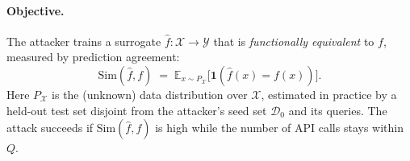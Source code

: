 \documentclass[sigconf,anonymous,review]{acmart}
\begin{document}
\paragraph{Objective.}
The attacker trains a surrogate $\hat{f} : \mathcal{X} \to \mathcal{Y}$ that is
\emph{functionally equivalent} to $f$, measured by prediction agreement:
\begin{equation}
    \mathrm{Sim}(\hat{f}, f) \;=\; \mathbb{E}_{x \sim P_{\mathcal{X}}}
    \bigl[\mathbf{1}(\hat{f}(x) = f(x))\bigr].
    \label{eq:sim}
\end{equation}
Here $P_{\mathcal{X}}$ is the (unknown) data distribution over $\mathcal{X}$,
estimated in practice by a held-out test set disjoint from the attacker's seed set
$\mathcal{D}_{0}$ and its queries.
The attack succeeds if $\mathrm{Sim}(\hat{f}, f)$ is high while the number of API
calls stays within $Q$. 
\end{document}
